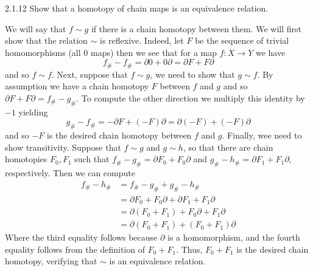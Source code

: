 \documentclass{article}
\begin{document}
\begin{exercise}{2.1.12}{\parindent}
  Show that a homotopy of chain maps is an equivalence relation.
\end{exercise}
\begin{solution}{\parindent}
  We will say that $f \sim g$ if there is a chain homotopy between
  them. We will first show that the relation $\sim$ is
  reflexive. Indeed, let $F$ be the sequence of trivial homomorphisms
  (all 0 maps) then we see that for a map $f: X \to Y$ we have
  \[
  f_{\#} - f_{\#} = \partial 0 + 0\partial = \partial F + F\partial
  \]
  and so $f \sim f$. Next, suppose that $f \sim g$, we need to show
  that $g \sim f$. By assumption we have a chain homotopy $F$ between
  $f$ and $g$ and so $\partial F + F \partial = f_{\#} - g_{\#}$. To
  compute the other direction we multiply this identity by $-1$ yielding
  \[
  g_{\#} - f_{\#} = -\partial F + (-F)\partial = \partial (-F) +
  (-F)\partial
  \]
  and so $-F$ is the desired chain homotopy between $f$ and
  $g$. Finally, wee need to show transitivity. Suppose that $f \sim g$
  and $g \sim h$, so that there are chain homotopies $F_0,F_1$ such
  that $f_{\#} - g_{\#} = \partial F_0 + F_0\partial$ and $g_{\#} -
  h_{\#} = \partial F_1 + F_1\partial$, respectively. Then we can compute
  \begin{align*}
    f_{\#} - h_{\#} & = f_{\#} - g_{\#} +g_{\#} - h_{\#} \\
    &= \partial F_0 + F_0\partial + \partial F_1 + F_1\partial \\
    &= \partial(F_0 + F_1) + F_0\partial + F_1\partial \\
    &= \partial(F_0 + F_1) + (F_0 + F_1)\partial
  \end{align*}
  Where the third equality follows because $\partial$ is a
  homomorphism, and the fourth equality follows from the definition of
  $F_0+F_1$. Thus, $F_0+F_1$ is the desired chain homotopy, verifying
  that $\sim$ is an equivalence relation.
\end{solution}
\end{document}
